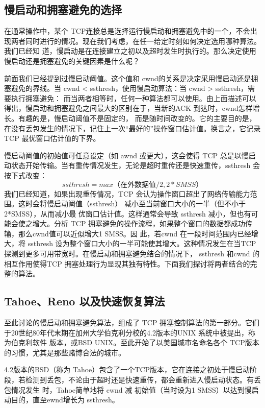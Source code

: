 \subsection{慢启动和拥塞避免的选择}
在通常操作中，某个 TCP连接总是选择运行慢启动和拥塞避免中的一个，不会出现两者同时进行的情况。现在我们考虑，在任一给定时刻如何决定选用哪种算法。我们已经知
道，慢启动是在连接建立之初以及超时发生时执行的。那么决定使用慢启动还是拥塞避免的关键因素是什么呢？

前面我们已经提到过慢启动阈值。这个值和 cwnd的关系是决定采用慢启动还是拥塞避免的界线。当 cwnd < ssthresh，使用慢启动算法：当 cwnd > ssthresh，需要执行拥塞避免：
而当两者相等时，任何一种算法都可以使用。由上面描述可以得出，慢启动和拥塞避免之间最大的区别在于，当新的ACK 到达时，cwnd怎样增长。有趣的是，慢启动阈值不是固定的，
而是随时间改变的。它的主要目的是，在没有丢包发生的情况下，记住上一次“最好的”操作窗口估计值。换言之，它记录 TCP 最优窗口估计值的下界。

慢启动阈值的初始值可任意设定（如 awnd 或更大），这会使得 TCP 总是以慢启动状态开始传输。当有重传情况发生，无论是超时重传还是快速重传，ssthresh 会按下式改变：
\begin{equation}
    ssthresh = max（在外数据值 /2, 2*SMSS）
\end{equation}
我们已经知道，如果出现重传情况，TCP 会认为操作窗口超出了网络传输能力范围。这时会将慢启动阈值（ssthresh） 减小至当前窗口大小的一半（但不小于 2*SMSS），从而减小最
优窗口估计值。这样通常会导致 ssthresh 减小，但也有可能会使之增大。分析 TCP 拥塞避免的操作流程，如果整个窗口的数据都成功传输，那么cwnd值可以近似增大1 SMSS。因
此，若cwnd 在一段时间范围内已经增大，将 ssthresh 设为整个窗口大小的一半可能使其增大。这种情况发生在当TCP 探测到更多可用带宽时。在慢启动和拥塞避免结合的情况下，
ssthresh 和cwnd 的相互作用使得TCP 拥塞处理行为显现其独有特性。下面我们探讨将两者结合的完整的算法。

\subsection{Tahoe、Reno 以及快速恢复算法}
至此讨论的慢启动和拥塞避免算法，组成了 TCP 拥塞控制算法的第一部分。它们于20世纪80年代末期在加州大学伯克利分校的4.2版本的UNIX 系统中被提出，称为伯克利软件
版本，或BSD UNIX。至此开始了以美国城市名命名各个 TCP版本的习惯，尤其是那些赌博合法的城市。

4.2版本的BSD（称为 Tahoe）包含了一个TCP版本，它在连接之初处于慢启动阶段，若检测到丢包，不论由于超时还是快速重传，都会重新进入慢启动状态。有丢包情况发生
时，Tahoe简单地将 cwnd 减 初始值（当时设为1 SMSS）以达到慢启动目的，直至ewnd增长为 ssthresh。

